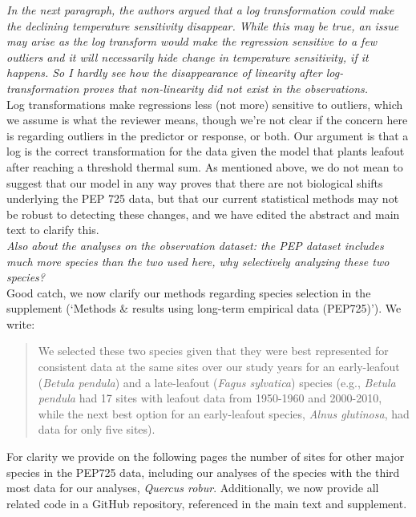\documentclass[11pt]{article}
\begin{document}
\emph{In the next paragraph, the authors argued that a log transformation could make the declining temperature sensitivity disappear. While this may be true, an issue may arise as the log transform would make the regression sensitive to a few outliers and it will necessarily hide change in temperature sensitivity, if it happens. So I hardly see how the disappearance of linearity after log-transformation proves that non-linearity did not exist in the observations.}\\

Log transformations make regressions less (not more) sensitive to outliers, which we assume is what the reviewer means, though we're not clear if the concern here is regarding outliers in the predictor or response, or both. Our argument is that a log is the correct transformation for the data given the model that plants leafout after reaching a threshold thermal sum. As mentioned above, we do not mean to suggest that our model in any way proves that there are not biological shifts underlying the PEP 725 data, but that our current statistical methods may not be robust to detecting these changes, and we have edited the abstract and main text to clarify this. \\

\emph{Also about the analyses on the observation dataset: the PEP dataset includes much more species than the two used here, why selectively analyzing these two species?}\\

Good catch, we now clarify our methods regarding species selection in the supplement (`Methods \& results using long-term empirical data (PEP725)'). We write:
\begin{quote}
 We selected these two species given that they were best represented for consistent data at the same sites over our study years for an early-leafout (\emph{Betula pendula}) and a late-leafout (\emph{Fagus sylvatica}) species (e.g., \emph{Betula pendula} had 17 sites with leafout data from 1950-1960 and 2000-2010, while the next best option for an early-leafout species, \emph{Alnus glutinosa}, had data for only five sites). 
\end{quote}
For clarity we provide on the following pages the number of sites for other major species in the PEP725 data, including our analyses of the species with the third most data for our analyses, \emph{Quercus robur}. Additionally, we now provide all related code in a GitHub repository, referenced in the main text and supplement.\\
\end{document}
